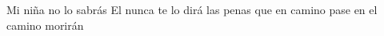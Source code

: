     Mi niña no lo sabrás
    El nunca te lo dirá
    las penas que en camino pase
    en el camino morirán
\endverse
